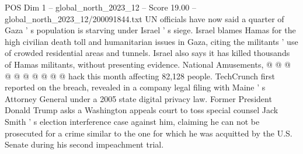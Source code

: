 \begin{textsample}{POS Dim 1 – global\_north\_2023\_12 – Score 19.00 – global\_north\_2023\_12/200091844.txt}
UN officials have now said a quarter of Gaza ' s population is starving under Israel ' s siege.
Israel blames Hamas for the high civilian death toll and humanitarian issues in Gaza, citing the militants ' use of crowded residential areas and tunnels.
Israel also says it has killed thousands of Hamas militants, without presenting evidence.
National Amusements, @ @ @ @ @ @ @ @ @ @ hack this month affecting 82,128 people.
TechCrunch first reported on the breach, revealed in a company legal filing with Maine ' s Attorney General under a 2005 state digital privacy law.
Former President Donald Trump asks a Washington appeals court to toss special counsel Jack Smith ' s election interference case against him, claiming he can not be prosecuted for a crime similar to the one for which he was acquitted by the U.S.
Senate during his second impeachment trial.

\end{textsample}
